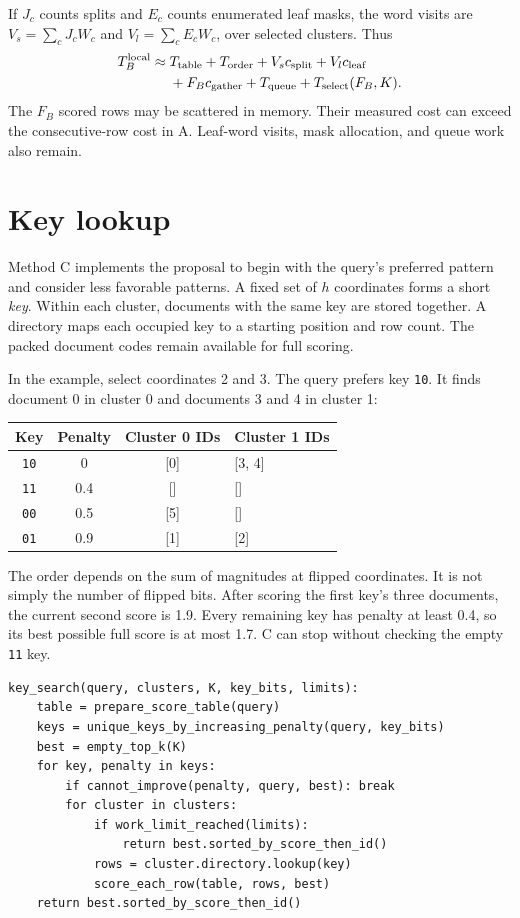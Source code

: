 \documentclass[11pt,a4paper]{article}
\begin{document}
If $J_c$ counts splits and $E_c$ counts enumerated leaf masks, the word visits are
$V_s=\sum_c J_cW_c$ and $V_l=\sum_c E_cW_c$, over selected clusters. Thus
\begin{equation}
\begin{split}
 T_B^{\rm local}\approx{}&T_{\rm table}+T_{\rm order}+V_sc_{\rm split}+V_lc_{\rm leaf}\\
 &+F_Bc_{\rm gather}+T_{\rm queue}+T_{\rm select}(F_B,K).
\end{split}
\label{eq:b}
\end{equation}
The $F_B$ scored rows may be scattered in memory. Their measured cost can exceed the
consecutive-row cost in A. Leaf-word visits, mask allocation, and queue work also remain.

\newpage
\section{Key lookup}
Method C implements the proposal to begin with the query's preferred pattern and consider
less favorable patterns. A fixed set of $h$ coordinates forms a short \emph{key}. Within
each cluster, documents with the same key are stored together. A directory maps each
occupied key to a starting position and row count. The packed document codes remain
available for full scoring.

In the example, select coordinates 2 and 3. The query prefers key \texttt{10}. It finds
document 0 in cluster 0 and documents 3 and 4 in cluster 1:
\begin{center}
\begin{tabular}{@{}cccl@{}}\toprule
Key & Penalty & Cluster 0 IDs & Cluster 1 IDs\\\midrule
\texttt{10} & 0 & [0] & [3, 4]\\
\texttt{11} & 0.4 & [] & []\\
\texttt{00} & 0.5 & [5] & []\\
\texttt{01} & 0.9 & [1] & [2]\\\bottomrule
\end{tabular}
\end{center}
The order depends on the sum of magnitudes at flipped coordinates. It is not simply the
number of flipped bits. After scoring the first key's three documents, the current second
score is 1.9. Every remaining key has penalty at least 0.4, so its best possible full score
is at most 1.7. C can stop without checking the empty \texttt{11} key.

\begin{lstlisting}[caption={Method C: enumerate keys by weighted penalty.}]
key_search(query, clusters, K, key_bits, limits):
    table = prepare_score_table(query)
    keys = unique_keys_by_increasing_penalty(query, key_bits)
    best = empty_top_k(K)
    for key, penalty in keys:
        if cannot_improve(penalty, query, best): break
        for cluster in clusters:
            if work_limit_reached(limits):
                return best.sorted_by_score_then_id()
            rows = cluster.directory.lookup(key)
            score_each_row(table, rows, best)
    return best.sorted_by_score_then_id()
\end{lstlisting}
\end{document}
